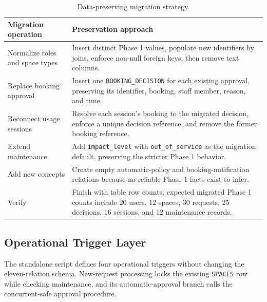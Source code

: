 \begin{table}[H]
  \centering
  \small
  \begin{tabularx}{\textwidth}{>{\raggedright\arraybackslash}p{3.8cm}X}
    \toprule
    \textbf{Migration operation} & \textbf{Preservation approach}\\
    \midrule
    Normalize roles and space types &
    Insert distinct Phase 1 values, populate new identifiers by joins, enforce non-null foreign keys, then remove text columns.\\
    Replace booking approval &
    Insert one \texttt{BOOKING\_DECISION} for each existing approval, preserving its identifier, booking, staff member, reason, and time.\\
    Reconnect usage sessions &
    Resolve each session's booking to the migrated decision, enforce a unique decision reference, and remove the former booking reference.\\
    Extend maintenance &
    Add \texttt{impact\_level} with \texttt{out\_of\_service} as the migration default, preserving the stricter Phase 1 behavior.\\
    Add new concepts &
    Create empty automatic-policy and booking-notification relations because no reliable Phase 1 facts exist to infer.\\
    Verify &
    Finish with table row counts; expected migrated Phase 1 counts include 20 users, 12 spaces, 30 requests, 25 decisions, 16 sessions, and 12 maintenance records.\\
    \bottomrule
  \end{tabularx}
  \caption{Data-preserving migration strategy.}
\end{table}

\subsection{Operational Trigger Layer}

The standalone  script defines four operational triggers without changing the eleven-relation schema. New-request processing locks the existing \texttt{SPACES} row while checking maintenance, and its automatic-approval branch calls the concurrent-safe approval procedure.

